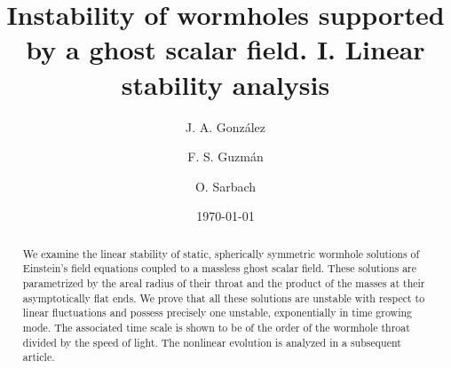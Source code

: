 \documentclass[           %
               showpacs,            %
               preprintnumbers,     %
               aps,                 %
               prd,                 %
               superscriptaddress,      %
               nofootinbib,         %
               tightenlines,        %
               floats,floatfix      %
               ]{revtex4}
\begin{document}

\title{Instability of wormholes supported by a ghost scalar field. 
I. Linear stability analysis}


\author{J. A. Gonz\'alez}

\author{F. S. Guzm\'an}

\author{O. Sarbach}


\date{\today}



\begin{abstract}
We examine the linear stability of static, spherically symmetric
wormhole solutions of Einstein's field equations coupled to a massless
ghost scalar field. These solutions are parametrized by the areal
radius of their throat and the product of the masses at their
asymptotically flat ends. We prove that all these solutions are
unstable with respect to linear fluctuations and possess precisely one
unstable, exponentially in time growing mode. The associated time
scale is shown to be of the order of the wormhole throat divided by
the speed of light. The nonlinear evolution is analyzed in a
subsequent article.
\end{abstract}


\end{document}
